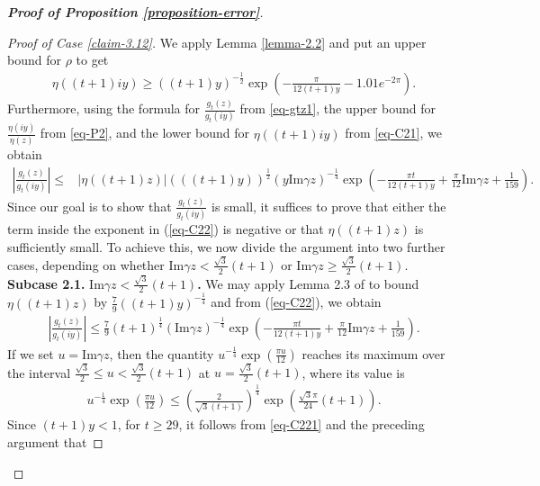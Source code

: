 \documentclass[11pt]{amsart}
\theoremstyle{plain}
\numberwithin{equation}{section}
\begin{document}
\begin{proof}[\textbf{\boldmath Proof of Proposition \ref{proposition-error}}]
\begin{proof}[Proof of Case \ref{claim-3.12}]
			We apply Lemma \ref{lemma-2.2} and put an upper bound for $\rho$ to get
			\begin{align}\label{eq-C21}
				\eta((t+1)iy) \ge((t+1)y)^{-\frac{1}{2}}\exp\left(-\frac{\pi}{12(t+1)y}-1.01e^{-2\pi}\right).    
			\end{align}
			Furthermore, using the formula for $\frac{g_t(z)}{g_t(iy)}$ from \eqref{eq-gtz1}, the upper bound for $\frac{\eta(iy)}{\eta(z)}$ from \eqref{eq-P2}, and the lower bound for $\eta((t+1)iy)$ from \eqref{eq-C21}, we obtain
			\begin{align}\label{eq-C22}
				\left|\frac{g_{t}(z)}{g_t(iy)}\right|\le & |\eta((t+1)z)|(((t+1)y))^{\frac{1}{2}}(y\text{Im}\gamma z)^{-\frac{1}{4}}\exp\left(-\frac{\pi t}{12(t+1)y}+\frac{\pi}{12}\text{Im}\gamma z +\frac{1}{159}\right).
			\end{align}
			Since our goal is to show that $\frac{g_t(z)}{g_t(iy)}$ is small, it suffices to prove that either the term inside the exponent in (\ref{eq-C22}) is negative or that $\eta((t+1)z)$ is sufficiently small. To achieve this, we now divide the argument into two further cases, depending on whether $\text{Im}\gamma z< \frac{\sqrt{3}}{2}(t+1)$ or $\text{Im}\gamma z\ge \frac{\sqrt{3}}{2}(t+1)$. \newline
			\textbf{Subcase 2.1.} \textbf{\boldmath $\text{Im}\gamma z< \frac{\sqrt{3}}{2}(t+1)$.} 
			\newline
			We may apply Lemma 2.3 of \cite{tyler2024asymptotics} to bound $\eta((t+1)z)$ by $\frac{7}{9}((t+1)y)^{-\frac{1}{4}}$ and from (\ref{eq-C22}), we obtain
			\begin{align}\label{eq-C221}
				\left|\frac{g_{t}(z)}{g_t(iy)}\right|\le \frac{7}{9}(t+1)^{\frac{1}{4}}(\text{Im}\gamma z)^{-\frac{1}{4}}\exp\left(-\frac{\pi t}{12(t+1)y}+\frac{\pi}{12}\text{Im}\gamma z +\frac{1}{159}\right).
			\end{align}
			If we set $u=\text{Im}\gamma z$, then the quantity $u^{-\frac{1}{4}}\exp\left(\frac{\pi u}{12}\right)$ reaches its maximum over the interval $\frac{\sqrt{3}}{2} \le u < \frac{\sqrt{3}}{2}(t+1)$ at $u=\frac{\sqrt{3}}{2}(t+1)$, where its value is
			\begin{align*}
				u^{-\frac{1}{4}}\exp\left(\frac{\pi u}{12}\right)\le \left(\frac{2}{\sqrt{3}(t+1)}\right)^{\frac{1}{4}}\exp\left(\frac{\sqrt{3}\pi}{24}(t+1)\right).    
			\end{align*}
			Since $(t+1)y<1$, for $t\ge 29$, it follows from \eqref{eq-C221} and the preceding argument that

\end{proof}
\end{proof}
\end{document}
